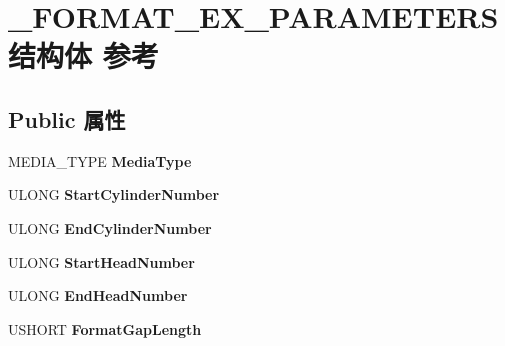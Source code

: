 \hypertarget{struct___f_o_r_m_a_t___e_x___p_a_r_a_m_e_t_e_r_s}{}\section{\+\_\+\+F\+O\+R\+M\+A\+T\+\_\+\+E\+X\+\_\+\+P\+A\+R\+A\+M\+E\+T\+E\+R\+S结构体 参考}
\label{struct___f_o_r_m_a_t___e_x___p_a_r_a_m_e_t_e_r_s}
\subsection*{Public 属性}
\begin{DoxyCompactItemize}
\item 
\mbox{\label{struct___f_o_r_m_a_t___e_x___p_a_r_a_m_e_t_e_r_s_a7e757525c2042c161294209a7d2007ea}} 
M\+E\+D\+I\+A\+\_\+\+T\+Y\+PE {\bfseries Media\+Type}
\item 
\mbox{\label{struct___f_o_r_m_a_t___e_x___p_a_r_a_m_e_t_e_r_s_a8b1826ea33ba5f3bbf8d47a94958b2f7}} 
U\+L\+O\+NG {\bfseries Start\+Cylinder\+Number}
\item 
\mbox{\label{struct___f_o_r_m_a_t___e_x___p_a_r_a_m_e_t_e_r_s_a763adb61e7892fd484ec1c0fe2a73267}} 
U\+L\+O\+NG {\bfseries End\+Cylinder\+Number}
\item 
\mbox{\label{struct___f_o_r_m_a_t___e_x___p_a_r_a_m_e_t_e_r_s_a6c5a197a4fa15c71353bddcb9da69d8e}} 
U\+L\+O\+NG {\bfseries Start\+Head\+Number}
\item 
\mbox{\label{struct___f_o_r_m_a_t___e_x___p_a_r_a_m_e_t_e_r_s_a381960b947e703e81886a32d361084ba}} 
U\+L\+O\+NG {\bfseries End\+Head\+Number}
\item 
\mbox{\label{struct___f_o_r_m_a_t___e_x___p_a_r_a_m_e_t_e_r_s_aab67207e890aa00d8bea80c5a44e182a}} 
U\+S\+H\+O\+RT {\bfseries Format\+Gap\+Length}
\item 
\mbox{\label{struct___f_o_r_m_a_t___e_x___p_a_r_a_m_e_t_e_r_s_a252021f05e32ea36dd9d1a04d2a0f4e7}} 

\end{DoxyCompactItemize}
